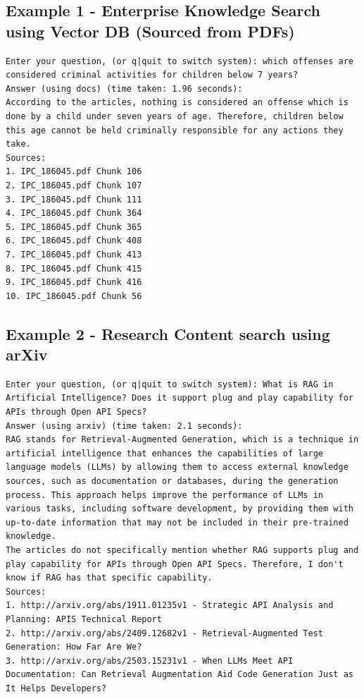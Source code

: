 \documentclass[default]{sn-jnl}%
\begin{document}
\subsection*{Example 1 - Enterprise Knowledge Search using Vector DB (Sourced from PDFs)}
\begin{lstlisting}[basicstyle=\ttfamily\small, frame=single, breaklines=true]
Enter your question, (or q|quit to switch system): which offenses are considered criminal activities for children below 7 years?
Answer (using docs) (time taken: 1.96 seconds):
According to the articles, nothing is considered an offense which is done by a child under seven years of age. Therefore, children below this age cannot be held criminally responsible for any actions they take. 
Sources:
1. IPC_186045.pdf Chunk 106
2. IPC_186045.pdf Chunk 107
3. IPC_186045.pdf Chunk 111
4. IPC_186045.pdf Chunk 364
5. IPC_186045.pdf Chunk 365
6. IPC_186045.pdf Chunk 408
7. IPC_186045.pdf Chunk 413
8. IPC_186045.pdf Chunk 415
9. IPC_186045.pdf Chunk 416
10. IPC_186045.pdf Chunk 56
\end{lstlisting}

\subsection*{Example 2 - Research Content search using arXiv}
\begin{lstlisting}[basicstyle=\ttfamily\small, frame=single, breaklines=true]
Enter your question, (or q|quit to switch system): What is RAG in Artificial Intelligence? Does it support plug and play capability for APIs through Open API Specs?
Answer (using arxiv) (time taken: 2.1 seconds):
RAG stands for Retrieval-Augmented Generation, which is a technique in artificial intelligence that enhances the capabilities of large language models (LLMs) by allowing them to access external knowledge sources, such as documentation or databases, during the generation process. This approach helps improve the performance of LLMs in various tasks, including software development, by providing them with up-to-date information that may not be included in their pre-trained knowledge.
The articles do not specifically mention whether RAG supports plug and play capability for APIs through Open API Specs. Therefore, I don't know if RAG has that specific capability.
Sources:
1. http://arxiv.org/abs/1911.01235v1 - Strategic API Analysis and Planning: APIS Technical Report
2. http://arxiv.org/abs/2409.12682v1 - Retrieval-Augmented Test Generation: How Far Are We?
3. http://arxiv.org/abs/2503.15231v1 - When LLMs Meet API Documentation: Can Retrieval Augmentation Aid Code Generation Just as It Helps Developers?
\end{lstlisting}
\end{document}
